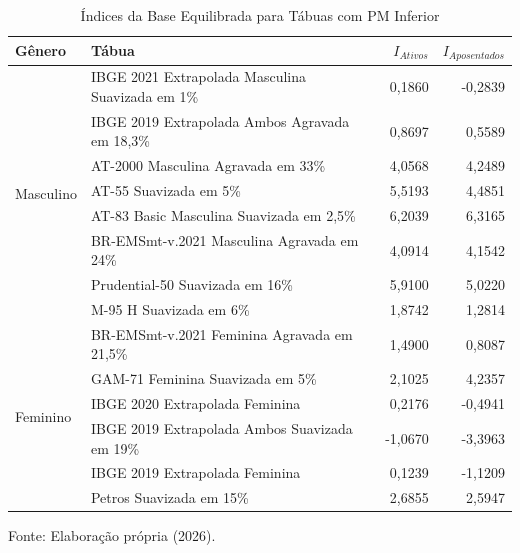 \begin{table}[htbp]
    \centering
    \caption{Índices da Base Equilibrada para Tábuas com PM Inferior}
    \begin{threeparttable}
    \renewcommand{\arraystretch}{1.0}
    \begin{tabular}{llrr}
    \toprule
    \textbf{Gênero} & \textbf{Tábua} & \textbf{$I_{Ativos}$} & \textbf{$I_{Aposentados}$} \\ 
    \midrule
    \multirow{8}{*}{Masculino} 
        & IBGE 2021 Extrapolada Masculina Suavizada em 1\%      & 0,1860 & -0,2839 \\
        & IBGE 2019 Extrapolada Ambos Agravada em 18,3\%  & 0,8697 &  0,5589 \\
        & AT-2000 Masculina Agravada em 33\%              & 4,0568 &  4,2489 \\
        & AT-55 Suavizada em 5\%                    & 5,5193 &  4,4851 \\
        & AT-83 Basic Masculina Suavizada em 2,5\%          & 6,2039 &  6,3165 \\
        & BR-EMSmt-v.2021 Masculina Agravada em 24\%      & 4,0914 &  4,1542 \\
        & Prudential-50 Suavizada em 16\%           & 5,9100 &  5,0220 \\
        & M-95 H Suavizada em 6\%                   & 1,8742 &  1,2814 \\
    \hline
    \multirow{6}{*}{Feminino}
        & BR-EMSmt-v.2021 Feminina Agravada em 21,5\%    &  1,4900 &  0,8087 \\
        & GAM-71 Feminina Suavizada em 5\%                 &  2,1025 &  4,2357 \\
        & IBGE 2020 Extrapolada Feminina                &  0,2176 & -0,4941 \\
        & IBGE 2019 Extrapolada Ambos Suavizada em 19\% & -1,0670 & -3,3963 \\
        & IBGE 2019 Extrapolada Feminina                &  0,1239 & -1,1209 \\
        & Petros Suavizada em 15\%              &  2,6855 &  2,5947 \\
    \bottomrule
    \end{tabular}
    \begin{tablenotes}[flushleft]
        \small
        \item Fonte: Elaboração própria (2026).
    \end{tablenotes}
    \end{threeparttable}
    \label{tab:indices_equilibrada_pminf}
\end{table}
